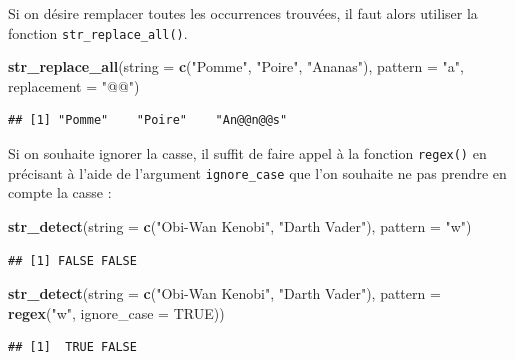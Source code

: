 \documentclass[
  11pt,
]{book}
\newenvironment{Shaded}{\begin{snugshade}}{\end{snugshade}}
\newcommand{\DataTypeTok}[1]{\textcolor[rgb]{0.13,0.29,0.53}{#1}}
\newcommand{\KeywordTok}[1]{\textcolor[rgb]{0.13,0.29,0.53}{\textbf{#1}}}
\newcommand{\NormalTok}[1]{#1}
\newcommand{\OtherTok}[1]{\textcolor[rgb]{0.56,0.35,0.01}{#1}}
\newcommand{\StringTok}[1]{\textcolor[rgb]{0.31,0.60,0.02}{#1}}
\numberwithin{equation}{section}
\numberwithin{countremarque}{section}
\begin{document}
Si on désire remplacer toutes les occurrences trouvées, il faut alors utiliser la fonction \texttt{str\_replace\_all()}.

\begin{Shaded}
\begin{Highlighting}[]
\KeywordTok{str\_replace\_all}\NormalTok{(}\DataTypeTok{string =} \KeywordTok{c}\NormalTok{(}\StringTok{"Pomme"}\NormalTok{, }\StringTok{"Poire"}\NormalTok{, }\StringTok{"Ananas"}\NormalTok{), }\DataTypeTok{pattern =} \StringTok{"a"}\NormalTok{, }\DataTypeTok{replacement =} \StringTok{"@@"}\NormalTok{)}
\end{Highlighting}
\end{Shaded}

\begin{lstlisting}
## [1] "Pomme"    "Poire"    "An@@n@@s"
\end{lstlisting}

Si on souhaite ignorer la casse, il suffit de faire appel à la fonction \texttt{regex()} en précisant à l'aide de l'argument \texttt{ignore\_case} que l'on souhaite ne pas prendre en compte la casse :

\begin{Shaded}
\begin{Highlighting}[]
\KeywordTok{str\_detect}\NormalTok{(}\DataTypeTok{string =} \KeywordTok{c}\NormalTok{(}\StringTok{"Obi{-}Wan Kenobi"}\NormalTok{, }\StringTok{"Darth Vader"}\NormalTok{), }\DataTypeTok{pattern =} \StringTok{"w"}\NormalTok{)}
\end{Highlighting}
\end{Shaded}

\begin{lstlisting}
## [1] FALSE FALSE
\end{lstlisting}

\begin{Shaded}
\begin{Highlighting}[]
\KeywordTok{str\_detect}\NormalTok{(}\DataTypeTok{string =} \KeywordTok{c}\NormalTok{(}\StringTok{"Obi{-}Wan Kenobi"}\NormalTok{, }\StringTok{"Darth Vader"}\NormalTok{), }
           \DataTypeTok{pattern =} \KeywordTok{regex}\NormalTok{(}\StringTok{"w"}\NormalTok{, }\DataTypeTok{ignore\_case =} \OtherTok{TRUE}\NormalTok{))}
\end{Highlighting}
\end{Shaded}

\begin{lstlisting}
## [1]  TRUE FALSE
\end{lstlisting}
\end{document}
